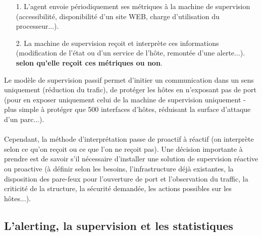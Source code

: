 \begin{itemize}
    \item[1.] L'agent envoie périodiquement ses métriques à la machine de supervision (accessibilité, disponibilité d'un site WEB, charge d'utilisation du processeur...).
    \item[2.] La machine de supervision reçoit et interprète ces informations (modification de l'état ou d'un service de l'hôte, remontée d'une alerte...). \textbf{selon qu'elle reçoit ces métriques ou non}.
\end{itemize}

\noindent Le modèle de supervision passif permet d'initier un communication dans un sens uniquement (réduction du trafic), de protéger les hôtes en n'exposant pas de port (pour en exposer uniquement celui de la machine de supervision uniquement - plus simple à protéger que 500 interfaces d'hôtes, réduisant la surface d'attaque d'un parc...).
\\ \\
Cependant, la méthode d'interprétation passe de proactif à réactif (on interprète selon ce qu'on reçoit ou ce que l'on ne reçoit pas). Une décision importante à prendre est de savoir s'il nécessaire d'installer une solution de supervision réactive ou proactive (à définir selon les besoins, l'infrastructure déjà existantes, la disposition des pare-feux pour l'ouverture de port et l'observation du traffic, la criticité de la structure, la sécurité demandée, les actions possibles sur les hôtes...).

\subsection{L'alerting, la supervision et les statistiques}

